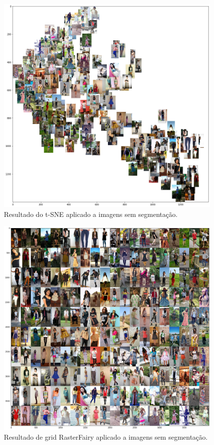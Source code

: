 \documentclass[12pt]{report}
\begin{document}
\begin{figure}
    \centering
    \includegraphics[scale=0.5]{images/resultados/tsne2.png}
    \caption{Resultado do t-SNE aplicado a imagens sem segmentação.}
    \label{fig:tsne1}
\end{figure}

\begin{figure}
    \centering
    \includegraphics[scale=0.4]{images/resultados/rast1.png}
    \caption{Resultado de grid RasterFairy aplicado a imagens sem segmentação.}
    \label{fig:rast1}
\end{figure}
\end{document}
